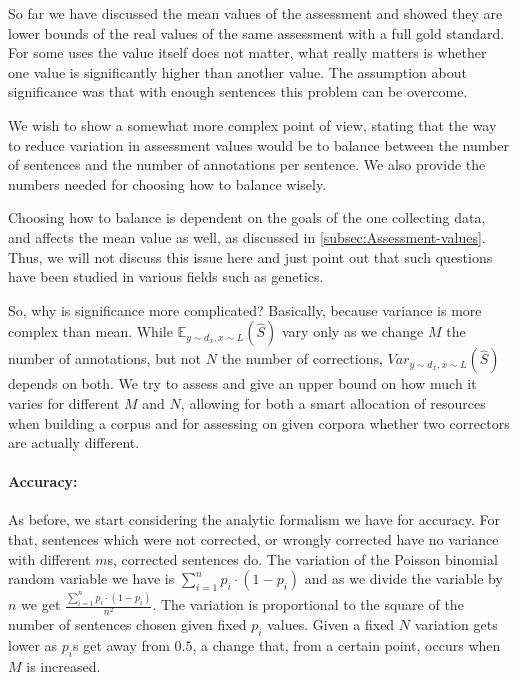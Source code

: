\documentclass[letter,11pt]{article}
\begin{document}
So far we have discussed the mean values of the assessment and showed they are lower bounds of the real values of the same assessment with a full gold standard. For some uses the value itself does not matter, what really matters is whether one value is significantly higher than another value. The assumption about significance was that with enough sentences this problem can be overcome.

We wish to show a somewhat more complex point of view, stating that the way to reduce variation in assessment values would be to balance between the number of sentences and the number of annotations per sentence. We also provide the numbers needed for choosing how to balance wisely. 

Choosing how to balance is dependent on the goals of the one collecting data, and affects the mean value as well, as discussed in \ref{subsec:Assessment-values}. Thus, we will not discuss this issue here and just point out that such questions have been studied in various fields such as genetics\cite{ionita2010optimal}.

So, why is significance more complicated? Basically, because variance is more complex than mean. While $\mathbb{E}_{y\sim d_x, x\sim L}\left(\hat{S}\right)$ vary only as we change $M$
the number of annotations, but not $N$ the number of corrections,
$Var_{y\sim d_x, x\sim L}(\hat{S})$ depends on both. We try to assess and give an upper
bound on how much it varies for different $M$ and $N$, allowing
for both a smart allocation of resources when building a corpus and for assessing on given corpora whether two correctors are actually different.

\begin{figure}
   	\texttt{[image: \$F\_\{0.5]}$_Ms_significance}
	\caption{F Score results with different sizes of gold standard.\label{fig:F_Ms}}
\end{figure}
\begin{figure}
   	\texttt{[image: \$F\_\{0.5]}$_significance}
	\caption{F Score results for different correctors including confidence interval.\label{fig:F_correctors}}
\end{figure}


\paragraph{Accuracy:} As before, we start considering the analytic formalism we have for accuracy. For that, sentences which were not corrected, or wrongly corrected have no variance with different $m$s, corrected sentences do. The variation of the Poisson binomial random variable we have is $\sum_{i=1}^{n}p_i\cdot\left(1-p_i\right)$ and as we divide the variable by $n$ we get $\frac{\sum_{i=1}^{n}p_i\cdot\left(1-p_i\right)}{n^2}$. 
The variation is proportional to the square of the number of sentences chosen given fixed $p_i$ values. Given a fixed $N$ variation gets lower as $p_i$s get away from $0.5$, a change that, from a certain point, occurs when $M$ is increased.
\end{document}
